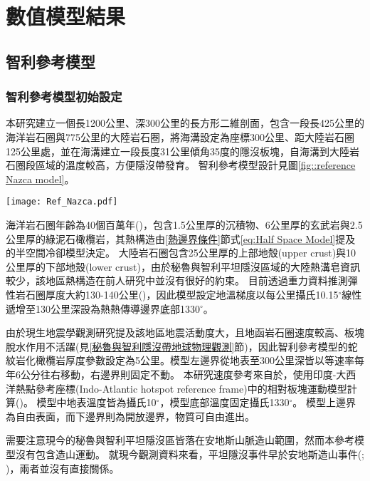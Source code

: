 
\chapter{數值模型結果}

\section{智利參考模型}
\subsection{智利參考模型初始設定}\label{智利參考模型初始模型設定}
本研究建立一個長1200公里、深300公里的長方形二維剖面，包含一段長425公里的海洋岩石圈與775公里的大陸岩石圈，將海溝設定為座標300公里、距大陸岩石圈125公里處，並在海溝建立一段長度31公里傾角35度的隱沒板塊，自海溝到大陸岩石圈段區域的溫度較高，方便隱沒帶發育。
智利參考模型設計見圖\ref{fig::reference Nazca model}。

\begin{figure*}[hb]
    \centering
    \texttt{[image: Ref\_Nazca.pdf]}
    \caption[智利參考模型設計與邊界條件示意圖]{智利參考模型設計與邊界條件示意圖}
    \label{fig::reference Nazca model}
\end{figure*}

海洋岩石圈年齡為40個百萬年(\citealp{muller2019})，包含1.5公里厚的沉積物、6公里厚的玄武岩與2.5公里厚的綠泥石橄欖岩，其熱構造由\ref{熱邊界條件}節式\ref{eq:Half Space Model}提及的半空間冷卻模型決定。
大陸岩石圈包含25公里厚的上部地殼(upper crust)與10公里厚的下部地殼(lower crust)，由於秘魯與智利平坦隱沒區域的大陸熱溝皂資訊較少，該地區熱構造在前人研究中並沒有很好的約束。
目前透過重力資料推測彈性岩石圈厚度大約130-140公里(\citealp{perez2008})，因此模型設定地溫梯度以每公里攝氏10.15$^{\circ}$線性遞增至130公里深設為熱熱傳導邊界底部1330$^{\circ}$。

由於現生地震學觀測研究提及該地區地震活動度大，且地函岩石圈速度較高、板塊脫水作用不活躍(見\ref{秘魯與智利隱沒帶地球物理觀測}節)，因此智利參考模型的蛇紋岩化橄欖岩厚度參數設定為5公里。模型左邊界從地表至300公里深皆以等速率每年6公分往右移動，右邊界則固定不動。
本研究速度參考來自於\citealp{o2005uncertainties}，使用印度-大西洋熱點參考座標(Indo-Atlantic hotspot reference frame)中的相對板塊運動模型計算(\citealp{schellart2008global})。
模型中地表溫度皆為攝氏10$^{\circ}$，模型底部溫度固定攝氏1330$^{\circ}$。
模型上邊界為自由表面，而下邊界則為開放邊界，物質可自由進出。

需要注意現今的秘魯與智利平坦隱沒區皆落在安地斯山脈造山範圍，然而本參考模型沒有包含造山運動。
就現今觀測資料來看，平坦隱沒事件早於安地斯造山事件(\citealp{chen2019southward}; \citealp{hu2021southward})，兩者並沒有直接關係。


